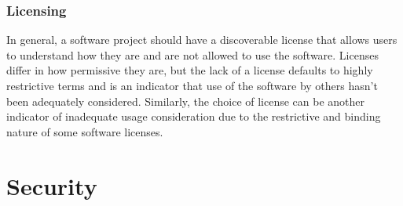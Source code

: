 \subsubsection{Licensing}
In general, a software project should have a discoverable license that allows users to understand how they are and are not allowed to use the software. Licenses differ in how permissive they are, but the lack of a license defaults to highly restrictive terms and is an indicator that use of the software by others hasn’t been adequately considered. Similarly, the choice of license can be another indicator of inadequate usage consideration due to the restrictive and binding nature of some software licenses. 


\section{Security}
